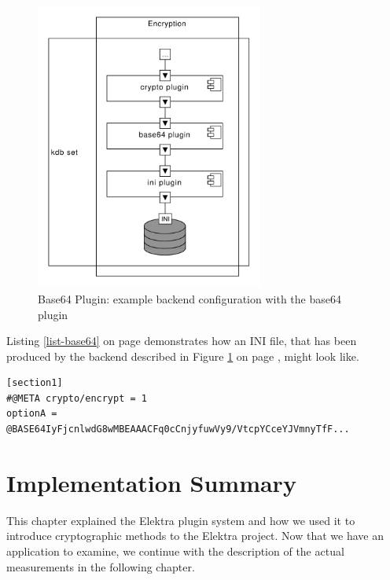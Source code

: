 \begin{figure}[h]
\center
\caption{Base64 Plugin: example backend configuration with the base64 plugin}
\label{impl_base64_overview}
\includegraphics[width=7.5cm]{umlet-figures/impl_base64_overview.pdf}
\end{figure}

Listing \ref{list-base64} on page \pageref{list-base64} demonstrates how an INI file, that has been produced by the backend described in Figure \ref{impl_base64_overview} on page \pageref{impl_base64_overview}, might look like.

\begin{lstlisting}[label=list-base64,caption={Base64 example INI output}]
[section1]
#@META crypto/encrypt = 1
optionA = @BASE64IyFjcnlwdG8wMBEAAACFq0cCnjyfuwVy9/VtcpYCceYJVmnyTfF...
\end{lstlisting}

\section{Implementation Summary}

This chapter explained the Elektra plugin system and how we used it to introduce cryptographic methods to the Elektra project.
Now that we have an application to examine, we continue with the description of the actual measurements in the following chapter.
